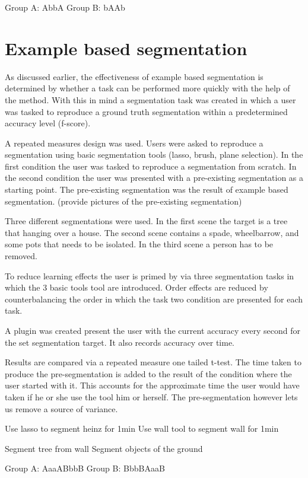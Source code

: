 Group A: AbbA
Group B: bAAb

\section{Example based segmentation}

As discussed earlier, the effectiveness of example based segmentation is determined by whether a task can be performed more quickly with the help of the method. With this in mind a segmentation task was created in which a user was tasked to reproduce a ground truth segmentation within a predetermined accuracy level (f-score).

A repeated measures design was used. Users were asked to reproduce a segmentation using basic segmentation tools (lasso, brush, plane selection). In the first condition the user was tasked to reproduce a segmentation from scratch. In the second condition the user was presented with a pre-existing segmentation as a starting point. The pre-existing segmentation was the result of example based segmentation. (provide pictures of the pre-existing segmentation)

Three different segmentations were used. In the first scene the target is a tree that hanging over a house. The second scene contains a spade, wheelbarrow, and some pots that needs to be isolated. In the third scene a person has to be removed.

To reduce learning effects the user is primed by via three segmentation tasks in which the 3 basic tools tool are introduced. Order effects are reduced by counterbalancing the order in which the task two condition are presented for each task.

A plugin was created present the user with the current accuracy every second for the set segmentation target. It also records accuracy over time.

Results are compared via a repeated measure one tailed t-test. The time taken to produce the pre-segmentation is added to the result of the condition where the user started with it. This accounts for the approximate time the user would have taken if he or she use the tool him or herself. The pre-segmentation however lets us remove a source of variance.

Use lasso to segment heinz for 1min
Use wall tool to segment wall for 1min

Segment tree from wall
Segment objects of the ground

Group A: AaaABbbB
Group B: BbbBAaaB


